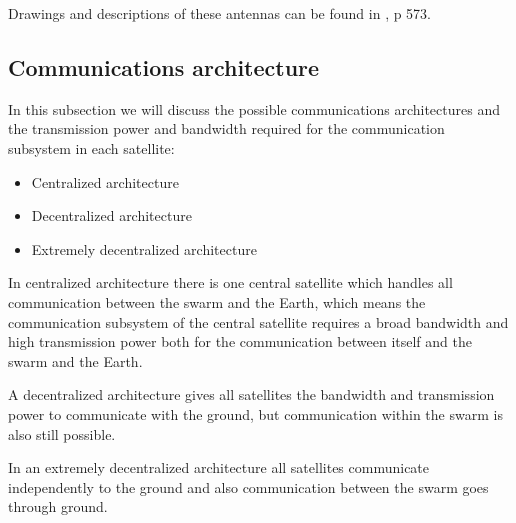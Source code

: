 Drawings and descriptions of these antennas can be found in \cite{Larson}, p 573.

\subsection{Communications architecture}
In this subsection we will discuss the possible communications architectures and the transmission power and bandwidth required for the communication subsystem in each satellite:
\begin{itemize}
\item Centralized architecture
\item Decentralized architecture
\item Extremely decentralized architecture
\end{itemize}

In centralized architecture there is one central satellite which handles all communication between the swarm and the Earth, which means the communication subsystem of the central satellite requires a broad bandwidth and high transmission power both for the communication between itself and the swarm and the Earth.

A decentralized architecture gives all satellites the bandwidth and transmission power to communicate with the ground, but communication within the swarm is also still possible.

In an extremely decentralized architecture all satellites communicate independently to the ground and also communication between the swarm goes through ground.